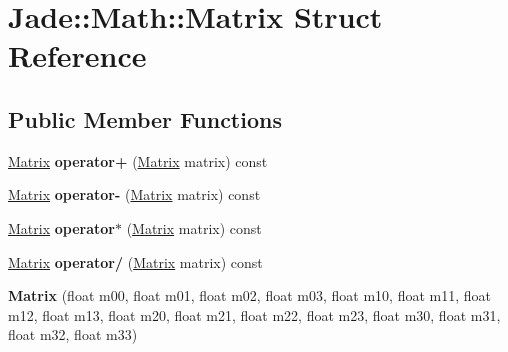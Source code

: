 \hypertarget{struct_jade_1_1_math_1_1_matrix}{}\section{Jade\+:\+:Math\+:\+:Matrix Struct Reference}
\label{struct_jade_1_1_math_1_1_matrix}
\subsection*{Public Member Functions}
\begin{DoxyCompactItemize}
\item 
\hypertarget{struct_jade_1_1_math_1_1_matrix_a1c9fccf66e7b1c1342513dba15cb5bda}{}\hyperlink{struct_jade_1_1_math_1_1_matrix}{Matrix} {\bfseries operator+} (\hyperlink{struct_jade_1_1_math_1_1_matrix}{Matrix} matrix) const \label{struct_jade_1_1_math_1_1_matrix_a1c9fccf66e7b1c1342513dba15cb5bda}

\item 
\hypertarget{struct_jade_1_1_math_1_1_matrix_aa298abd956e6475c098f6c6a15ad4f46}{}\hyperlink{struct_jade_1_1_math_1_1_matrix}{Matrix} {\bfseries operator-\/} (\hyperlink{struct_jade_1_1_math_1_1_matrix}{Matrix} matrix) const \label{struct_jade_1_1_math_1_1_matrix_aa298abd956e6475c098f6c6a15ad4f46}

\item 
\hypertarget{struct_jade_1_1_math_1_1_matrix_a650e8d6309890483dd1cac8501a6bc8a}{}\hyperlink{struct_jade_1_1_math_1_1_matrix}{Matrix} {\bfseries operator$\ast$} (\hyperlink{struct_jade_1_1_math_1_1_matrix}{Matrix} matrix) const \label{struct_jade_1_1_math_1_1_matrix_a650e8d6309890483dd1cac8501a6bc8a}

\item 
\hypertarget{struct_jade_1_1_math_1_1_matrix_a4568fc14ba54c95f6b7b13a9485622cb}{}\hyperlink{struct_jade_1_1_math_1_1_matrix}{Matrix} {\bfseries operator/} (\hyperlink{struct_jade_1_1_math_1_1_matrix}{Matrix} matrix) const \label{struct_jade_1_1_math_1_1_matrix_a4568fc14ba54c95f6b7b13a9485622cb}

\item 
\hypertarget{struct_jade_1_1_math_1_1_matrix_a114c08bf64318686c8cc5aa463ebe638}{}{\bfseries Matrix} (float m00, float m01, float m02, float m03, float m10, float m11, float m12, float m13, float m20, float m21, float m22, float m23, float m30, float m31, float m32, float m33)\label{struct_jade_1_1_math_1_1_matrix_a114c08bf64318686c8cc5aa463ebe638}


\end{DoxyCompactItemize}
